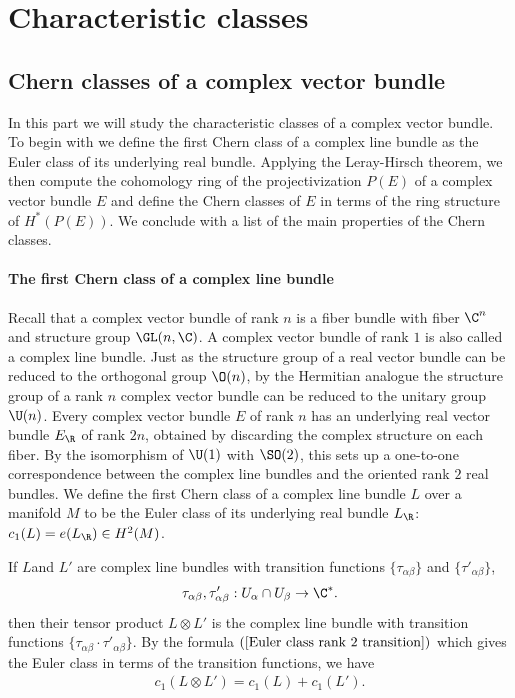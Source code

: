 \section{Characteristic classes}
\subsection{Chern classes of a complex vector bundle}
In this part we will study the characteristic classes of a complex vector bundle. To begin with we define the first Chern class of a complex line bundle as the Euler 
class of its underlying real bundle. Applying the Leray-Hirsch theorem, we then compute the cohomology ring of the projectivization $P(E)$ of a complex vector bundle $E$ 
and define the Chern classes of $E$ in terms of the ring structure of $H^*(P(E))$. We conclude with a list of the main properties of the Chern classes.
\paragraph{The first Chern class of a complex line bundle}
Recall that a complex vector bundle of rank $n$ is a fiber bundle with fiber $\C^n$ and structure group $\GL(n,\C)$. A complex vector bundle of rank $1$ is also called 
a complex line bundle. Just as the structure group of a real vector bundle can be reduced to the orthogonal group $\O(n)$, by the Hermitian analogue the structure group 
of a rank $n$ complex vector bundle can be reduced to the unitary group $\U(n)$. Every complex vector bundle $E$ of rank $n$ has an underlying real vector bundle $E_\R$ 
of rank $2n$, obtained by discarding the complex structure on each fiber. By the isomorphism of $\U(1)$ with $\SO(2)$, this sets up a one-to-one correspondence between 
the complex line bundles and the oriented rank $2$ real bundles. We define the first Chern class of a complex line bundle $L$ over a manifold $M$ to be the Euler class 
of its underlying real bundle $L_{\R}$: $c_1(L)=e(L_{\R})\in H^2(M)$.\par
If $L$and $L'$ are complex line bundles with transition functions $\{\tau_{\alpha\beta}\}$ and $\{\tau'_{\alpha\beta}\}$,
\[\tau_{\alpha\beta},\tau'_{\alpha\beta}:U_\alpha\cap U_\beta\to\C^*.\]
then their tensor product $L\otimes L'$ is the complex line bundle with transition functions $\{\tau_{\alpha\beta}\cdot\tau'_{\alpha\beta}\}$. By the formula 
$(\ref{Euler class rank 2 transition})$ which gives the Euler class in terms of the transition functions, we have
\begin{align}\label{Chern first tensor prod}
c_1(L\otimes L')=c_1(L)+c_1(L').
\end{align}

